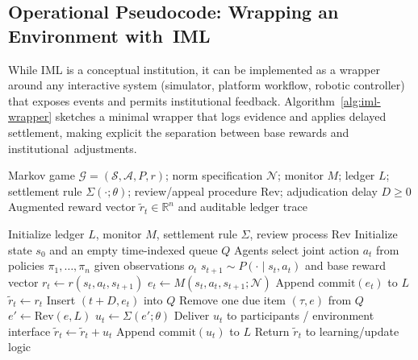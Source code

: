 \documentclass[mca,article,accept,pdftex,oneauthor]{Definitions/mdpi}
\begin{document}
\subsection{Operational Pseudocode: Wrapping an Environment with~IML}

While IML is a conceptual institution, it can be implemented as a wrapper around any interactive system (simulator, platform workflow, robotic controller) that exposes events and permits institutional feedback. Algorithm~\ref{alg:iml-wrapper} sketches a minimal wrapper that logs evidence and applies delayed settlement, making explicit the separation between base rewards and institutional~adjustments.

\begin{algorithm}[H]%
\caption{Institutional Monitoring and Ledger (IML) wrapper for a Markov~game}
\label{alg:iml-wrapper}
\begin{algorithmic}[1]
\Require Markov game $\mathcal{G}=(\mathcal{S},\mathcal{A},P,r)$; norm specification $\mathcal{N}$;
monitor $M$; ledger $L$; settlement rule $\Sigma(\cdot;\theta)$; review/appeal procedure $\mathrm{Rev}$;
adjudication delay $D\ge 0$
\Ensure Augmented reward vector $\tilde r_t\in\mathbb{R}^n$ and auditable ledger trace

\State Initialize ledger $L$, monitor $M$, settlement rule $\Sigma$, review process $\mathrm{Rev}$
  \State Initialize state $s_0$ and an empty time-indexed queue $Q$ 
    \State Agents select joint action $a_t$ from policies $\pi_1,\ldots,\pi_n$ given observations $o_t$
    \State $s_{t+1} \sim P(\cdot\mid s_t,a_t)$ and base reward vector $r_t \gets r(s_t,a_t,s_{t+1})$
    \State $e_t \gets M(s_t,a_t,s_{t+1};\mathcal{N})$ 
    \State Append $\mathrm{commit}(e_t)$ to $L$ 
    \State $\tilde r_t \gets r_t$ 
      \State Insert $(t{+}D,e_t)$ into $Q$
    \EndIf
      \State Remove one due item $(\tau,e)$ from $Q$
      \State $e' \gets \mathrm{Rev}(e,L)$ 
      \State $u_t \gets \Sigma(e';\theta)$ 
      \State Deliver $u_t$ to participants / environment interface
      \State $\tilde r_t \gets \tilde r_t + u_t$
      \State Append $\mathrm{commit}(u_t)$ to $L$ 
    \EndWhile
    \State Return $\tilde r_t$ to learning/update logic
  \EndFor
\EndFor
\end{algorithmic}
\end{algorithm}
\end{document}
